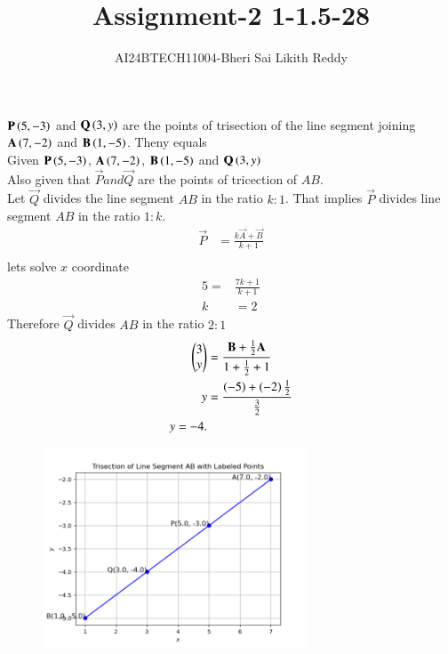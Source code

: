 \documentclass[journal]{IEEEtran}
\begin{document}

\onecolumn
\newpage
\title{Assignment-2  1-1.5-28}
\author{AI24BTECH11004-Bheri Sai Likith Reddy}
\maketitle
 $\mathbf{P}\left(5,-3\right)$ and $\mathbf{Q}\left(3,y\right)$ are the points of trisection of the line segment joining $\mathbf{A}\left(7,-2\right)$ and $\mathbf{B}\left(1,-5\right)$. Theny equals\\
\solution Given $\mathbf{P}\left(5,-3\right)$, $\mathbf{A}\left(7,-2\right)$, $\mathbf{B}\left(1,-5\right)$ and $\mathbf{Q}\left(3,y\right)$\\
Also given that $\vec{P} and \vec{Q} $ are the points of tricection of $AB$.\\
Let $\vec{Q}$ divides the line segment $AB$ in the ratio $k:1$.
That implies $\vec{P}$ divides line segment $AB$ in the ratio $1:k$.
\begin{align*}
	\vec{P}&= \frac{k\vec{A} +\vec{B}}{k+1}\\
\end{align*}
lets solve $x$ coordinate
\begin{align*}
	5=&\frac{7k+1}{k+1}\\
	k&=2
\end{align*}
Therefore $\vec{Q}$ divides $AB$ in the ratio $2:1$\\
\begin{align*}
	\begin{pmatrix}3\\ y\end{pmatrix}&=\frac{\mathbf{B} +\frac{1}{2}\mathbf{A} }{1+\frac{1}{2}+1 }\\
	y&=\frac{\left(-5\right)+\left(-2\right)\frac{1}{2}}{\frac{3}{2}}\\
	y=-4.
\end{align*}
\begin{table}[h!]
	\centering
	
\end{table}
\begin{figure}[h!]
    \centering
    \includegraphics[width=0.7\textwidth]{figs/figasgn2.png}
\end{figure}
\end{document}
